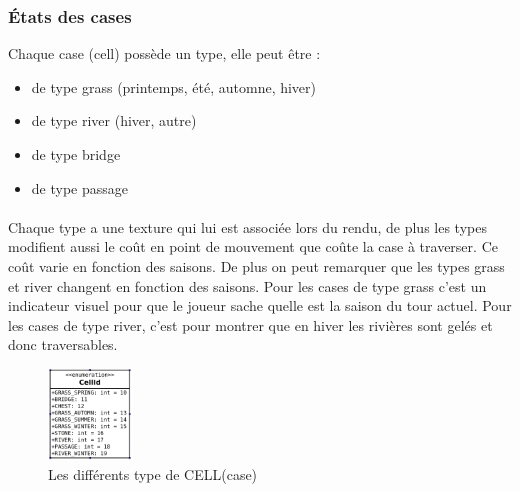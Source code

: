 \documentclass[a4paper,12pt]{article}
\begin{document}
\subsubsection{États des cases}
Chaque case (cell) possède un type, elle peut être :
\begin{itemize}
\item de type grass (printemps, été, automne, hiver)
\item de type river (hiver, autre)
\item de type bridge
\item de type passage
\end{itemize}
\paragraph{}Chaque type a une texture qui lui est associée lors du rendu, de plus les types modifient aussi le coût en point de mouvement que coûte la case à traverser. Ce coût varie en fonction des saisons. De plus on peut remarquer que les types grass et river changent en fonction des saisons. Pour les cases de type grass c'est un indicateur visuel pour que le joueur sache quelle est la saison du tour actuel. Pour les cases de type river, c'est pour montrer que en hiver les rivières sont gelés et donc traversables.
\begin{figure}[ht]
\begin{center}
\includegraphics[width=0.2\textwidth]{cell.png}
\caption{\label{pacmangame}Les différents type de CELL(case)}
\end{center}
\end{figure}
\end{document}
